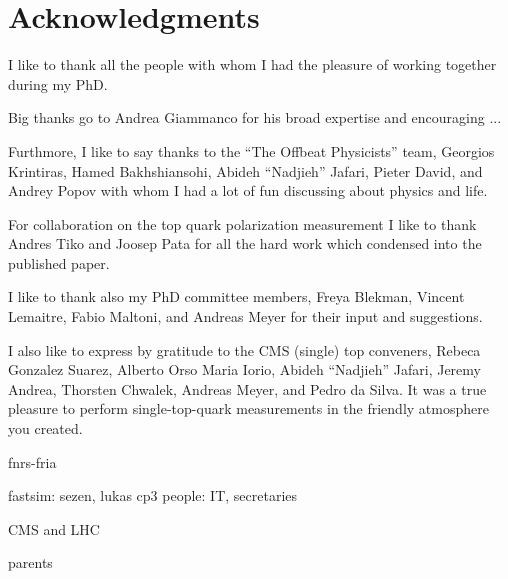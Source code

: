 \chapter*{Acknowledgments}

I like to thank all the people with whom I had the pleasure of working together during my PhD. 

Big thanks go to Andrea Giammanco for his broad expertise and encouraging ...

Furthmore, I like to say thanks to the ``The Offbeat Physicists'' team, Georgios Krintiras, Hamed Bakhshiansohi, Abideh ``Nadjieh'' Jafari, Pieter David, and Andrey Popov with whom I had a lot of fun discussing about physics and life.

For collaboration on the top quark polarization measurement I like to thank Andres Tiko and Joosep Pata for all the hard work which condensed into the published paper.

I like to thank also my PhD committee members, Freya Blekman, Vincent Lemaitre, Fabio Maltoni, and Andreas Meyer for their input and suggestions.

I also like to express by gratitude to the CMS (single) top conveners, Rebeca Gonzalez Suarez, Alberto Orso Maria Iorio, Abideh ``Nadjieh'' Jafari, Jeremy Andrea, Thorsten Chwalek, Andreas Meyer, and Pedro da Silva. It was a true pleasure to perform single-top-quark measurements in the friendly atmosphere you created.

fnrs-fria

fastsim: sezen, lukas
cp3 people: IT, secretaries

CMS and LHC

parents